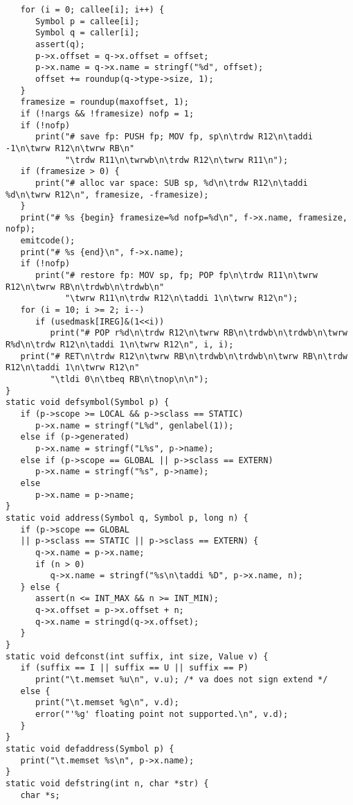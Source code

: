 {\begin{verbatim}
   for (i = 0; callee[i]; i++) {
      Symbol p = callee[i];
      Symbol q = caller[i];
      assert(q);
      p->x.offset = q->x.offset = offset;
      p->x.name = q->x.name = stringf("%d", offset);
      offset += roundup(q->type->size, 1);
   }
   framesize = roundup(maxoffset, 1);
   if (!nargs && !framesize) nofp = 1;
   if (!nofp)
      print("# save fp: PUSH fp; MOV fp, sp\n\trdw R12\n\taddi -1\n\twrw R12\n\twrw RB\n"
            "\trdw R11\n\twrwb\n\trdw R12\n\twrw R11\n");
   if (framesize > 0) {
      print("# alloc var space: SUB sp, %d\n\trdw R12\n\taddi %d\n\twrw R12\n", framesize, -framesize);
   }
   print("# %s {begin} framesize=%d nofp=%d\n", f->x.name, framesize, nofp);
   emitcode();
   print("# %s {end}\n", f->x.name);
   if (!nofp)
      print("# restore fp: MOV sp, fp; POP fp\n\trdw R11\n\twrw R12\n\twrw RB\n\trdwb\n\trdwb\n"
            "\twrw R11\n\trdw R12\n\taddi 1\n\twrw R12\n");
   for (i = 10; i >= 2; i--)
      if (usedmask[IREG]&(1<<i))
         print("# POP r%d\n\trdw R12\n\twrw RB\n\trdwb\n\trdwb\n\twrw R%d\n\trdw R12\n\taddi 1\n\twrw R12\n", i, i);
   print("# RET\n\trdw R12\n\twrw RB\n\trdwb\n\trdwb\n\twrw RB\n\trdw R12\n\taddi 1\n\twrw R12\n"
         "\tldi 0\n\tbeq RB\n\tnop\n\n");
}
static void defsymbol(Symbol p) {
   if (p->scope >= LOCAL && p->sclass == STATIC)
      p->x.name = stringf("L%d", genlabel(1));
   else if (p->generated)
      p->x.name = stringf("L%s", p->name);
   else if (p->scope == GLOBAL || p->sclass == EXTERN)
      p->x.name = stringf("%s", p->name);
   else
      p->x.name = p->name;
}
static void address(Symbol q, Symbol p, long n) {
   if (p->scope == GLOBAL
   || p->sclass == STATIC || p->sclass == EXTERN) {
      q->x.name = p->x.name;
      if (n > 0)
         q->x.name = stringf("%s\n\taddi %D", p->x.name, n);
   } else {
      assert(n <= INT_MAX && n >= INT_MIN);
      q->x.offset = p->x.offset + n;
      q->x.name = stringd(q->x.offset);
   }
}
static void defconst(int suffix, int size, Value v) {
   if (suffix == I || suffix == U || suffix == P)
      print("\t.memset %u\n", v.u); /* va does not sign extend */
   else {
      print("\t.memset %g\n", v.d);
      error("'%g' floating point not supported.\n", v.d);
   }
}
static void defaddress(Symbol p) {
   print("\t.memset %s\n", p->x.name);
}
static void defstring(int n, char *str) {
   char *s;


\end{verbatim}}
